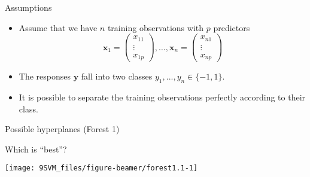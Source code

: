 \documentclass[10pt,ignorenonframetext,]{beamer}
\begin{document}
\begin{frame}

\begin{block}{Assumptions}

\vspace{2mm}

\begin{itemize}
\item
  Assume that we have \(n\) training observations with \(p\) predictors
  \[{\boldsymbol x}_1=\left(
    \begin{array}{c}
      x_{11} \\
      \vdots \\
      x_{1p}
      \end{array}
  \right), \ldots, {\boldsymbol x}_n=\left(
    \begin{array}{c}
      x_{n1} \\
      \vdots \\
      x_{np}
      \end{array}
  \right)\]
\item
  The responses \(\boldsymbol{y}\) fall into two classes
  \(y_1,...,y_n \in \{-1,1\}\).
\item
  It is possible to separate the training observations perfectly
  according to their class.
\end{itemize}

\end{block}

\end{frame}

\begin{frame}

\begin{block}{Possible hyperplanes (Forest 1)}

\vspace{2mm}

Which is ``best''?

\begin{center}\texttt{[image: 9SVM\_files/figure-beamer/forest1.1-1]} \end{center}

\end{block}

\end{frame}
\end{document}
